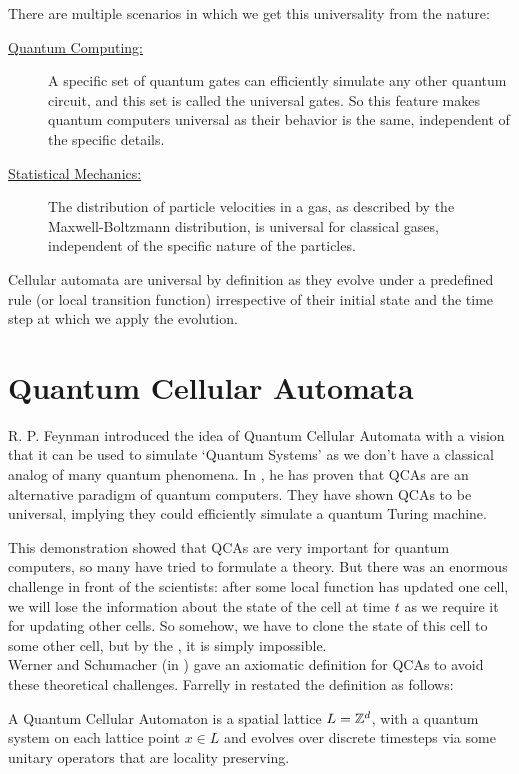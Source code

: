 \documentclass[11pt, oneside, listof=totoc]{scrbook}
\begin{document}
\noindent There are multiple scenarios in which we get this universality from the nature:
\begin{description}
    \item[\normalfont\sffamily \uline{Quantum Computing:}] A specific set of quantum gates can efficiently simulate any other quantum circuit, and this set is called the universal gates. So this feature makes quantum computers universal as their behavior is the same, independent of the specific details.

    \item[\normalfont\sffamily \uline{Statistical Mechanics:}] The distribution of particle velocities in a gas, as described by the Maxwell-Boltzmann distribution, is universal for classical gases, independent of the specific nature of the particles.
\end{description}

Cellular automata are universal by definition as they evolve under a predefined rule (or local transition function) irrespective of their initial state and the time step at which we apply the evolution.

\section{Quantum Cellular Automata}
R. P. Feynman introduced the idea of Quantum Cellular Automata with a vision that it can be used to simulate `Quantum Systems' as we don't have a classical analog of many quantum phenomena. In \cite{Watrous1995}, he has proven that QCAs are an alternative paradigm of quantum computers. They have shown QCAs to be universal, implying they could efficiently simulate a quantum Turing machine.

This demonstration showed that QCAs are very important for quantum computers, so many have tried to formulate a theory. But there was an enormous challenge in front of the scientists: after some local function has updated one cell, we will lose the information about the state of the cell at time \(t\) as we require it for updating other cells. So somehow, we have to clone the state of this cell to some other cell, but by the , it is simply impossible.\\

Werner and Schumacher (in \cite{Werner2004}) gave an axiomatic definition for QCAs to avoid these theoretical challenges. Farrelly in \cite{Farrelly2019} restated the definition as follows:

\begin{definition}
    A Quantum Cellular Automaton is a spatial lattice \(L = \mathbb Z^d\), with a quantum system on each lattice point \(x \in L\) and evolves over discrete timesteps via some unitary operators that are locality preserving.
\end{definition}
\end{document}
